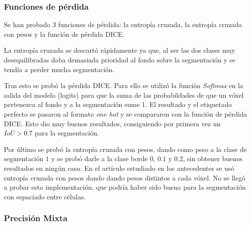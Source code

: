 \subsubsection{Funciones de pérdida}
Se han probado 3 funciones de pérdida: la entropía cruzada, la entropía cruzada con pesos y la función de pérdida DICE.

La entropía cruzada se descartó rápidamente ya que, al ser las dos clases muy desequilibradas daba demasiada prioridad al fondo sobre la segmentación y se tendía a perder mucha segmentación. 

Tras esto se probó la pérdida DICE. Para ello se utilizó la función \textit{Softmax} en la salida del modelo (logits) para que la suma de las probabildades de que un vóxel pertenezca al fondo y a la segmentación sume 1. El resultado y el etiquetado perfecto se pasaron al formato \textit{one hot} y se compararon con la función de pérdida DICE. Esto dio muy buenos resultados, consiguiendo por primera vez un $IoU>0.7$ para la segmentación.

Por último se probó la entropía cruzada con pesos, dando como peso a la clase de segmentación $1$ y se probó darle a la clase borde $0$, $0.1$ y $0.2$, sin obtener buenos resultados en ningún caso. En el artículo estudiado en los antecedentes \cite{Falk2019} se usó entropía cruzada con pesos dando dando pesos distintos a cada vóxel. No se llegó a probar esta implementación, que podría haber sido buena para la segmentación con espaciado entre células.

\subsubsection{Precisión Mixta}


